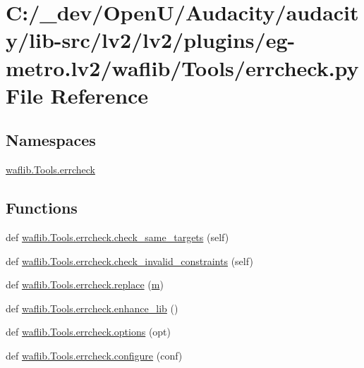 \hypertarget{lv2_2plugins_2eg-metro_8lv2_2waflib_2_tools_2errcheck_8py}{}\section{C\+:/\+\_\+dev/\+Open\+U/\+Audacity/audacity/lib-\/src/lv2/lv2/plugins/eg-\/metro.lv2/waflib/\+Tools/errcheck.py File Reference}
\label{lv2_2plugins_2eg-metro_8lv2_2waflib_2_tools_2errcheck_8py}
\subsection*{Namespaces}
\begin{DoxyCompactItemize}
\item 
 \hyperlink{namespacewaflib_1_1_tools_1_1errcheck}{waflib.\+Tools.\+errcheck}
\end{DoxyCompactItemize}
\subsection*{Functions}
\begin{DoxyCompactItemize}
\item 
def \hyperlink{namespacewaflib_1_1_tools_1_1errcheck_abfda92de66a72045068f150db1f86e29}{waflib.\+Tools.\+errcheck.\+check\+\_\+same\+\_\+targets} (self)
\item 
def \hyperlink{namespacewaflib_1_1_tools_1_1errcheck_a77b03ce1d3ecfd9295275ce9685d1c80}{waflib.\+Tools.\+errcheck.\+check\+\_\+invalid\+\_\+constraints} (self)
\item 
def \hyperlink{namespacewaflib_1_1_tools_1_1errcheck_a3c373d095646ee41f81dd43ade9e0b63}{waflib.\+Tools.\+errcheck.\+replace} (\hyperlink{layer3_8c_a4b8bfe70f28d6faddcb10d6ecf8c1989}{m})
\item 
def \hyperlink{namespacewaflib_1_1_tools_1_1errcheck_a7752dc841ad9140b7f0dc591120a6a0d}{waflib.\+Tools.\+errcheck.\+enhance\+\_\+lib} ()
\item 
def \hyperlink{namespacewaflib_1_1_tools_1_1errcheck_ac059af9fc4bbe227373b3081aef0221d}{waflib.\+Tools.\+errcheck.\+options} (opt)
\item 
def \hyperlink{namespacewaflib_1_1_tools_1_1errcheck_a8456470882cfc53f245e965934344c2f}{waflib.\+Tools.\+errcheck.\+configure} (conf)
\end{DoxyCompactItemize}
